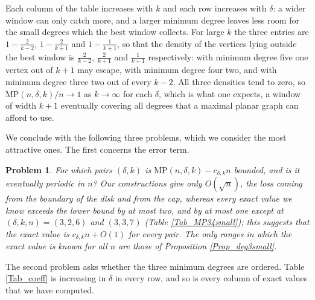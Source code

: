 \documentclass[10pt,a4paper]{article}
\newtheorem{problem}[theorem]{Problem}
\begin{document}
Each column of the table increases with $k$ and each row increases with $\delta $: a wider window can
only catch more, and a larger minimum degree leaves less room for the small degrees which the best
window collects. For large $k$ the three entries are $1-\frac{2}{k-2}$, $1-\frac{2}{k+1}$ and
$1-\frac{1}{k+1}$, so that the density of the vertices lying outside the best window is $\frac{2}{k-2}$,
$\frac{2}{k+1}$ and $\frac{1}{k+1}$ respectively: with minimum degree five one vertex out of $k+1$
may escape, with minimum degree four two, and with minimum degree three two out of every $k-2$.
All three densities tend to zero, so $\mathrm{MP}(n,\delta ,k)/n\to 1$ as $k\to \infty $ for each
$\delta $, which is what one expects, a window of width $k+1$ eventually covering all degrees that a
maximal planar graph can afford to use.






We conclude with the following three problems, which we consider the most attractive ones. The first
concerns the error term.

\begin{problem}
\label{Pr_error}
For which pairs $(\delta ,k)$ is $\mathrm{MP}(n,\delta ,k)-c_{\delta ,k}n$ bounded, and is it
eventually periodic in $n$? Our constructions give only $O(\sqrt{n})$, the loss coming from the
boundary of the disk and from the cap, whereas every exact value we know exceeds the lower bound by
at most two, and by at most one except at $(\delta ,k,n)=(3,2,6)$ and $(3,3,7)$ (Table
\ref{Tab_MP34small}); this suggests that the exact value is $c_{\delta ,k}n+O(1)$ for every pair. The only
ranges in which the exact value is known for all $n$ are those of Proposition \ref{Prop_deg3small}.
\end{problem}

The second problem asks whether the three minimum degrees are ordered. Table \ref{Tab_coeff} is
increasing in $\delta $ in every row, and so is every column of exact values that we have computed.
\end{document}
